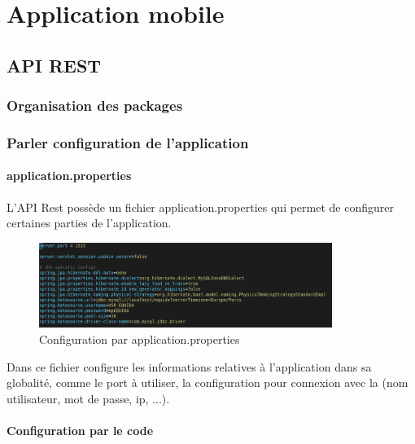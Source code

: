 \chapter{Application mobile}

	\section{API REST}

		\subsection{Organisation des packages}


		\subsection{Parler configuration de l'application}

			\subsubsection{application.properties}

			L'API Rest possède un fichier application.properties qui permet de configurer certaines parties de l'application.

			\begin{figure}[H]
				\centering\includegraphics[width=0.85\textwidth, keepaspectratio]{res/application-properties.png}
				\caption{Configuration par application.properties}
			\end{figure}

			Dans ce fichier configure les informations relatives à l'application dans sa globalité, comme le port à utiliser, la configuration pour connexion avec la \bdd{} (nom utilisateur, mot de passe, ip, ...).

			\subsubsection{Configuration par le code}

